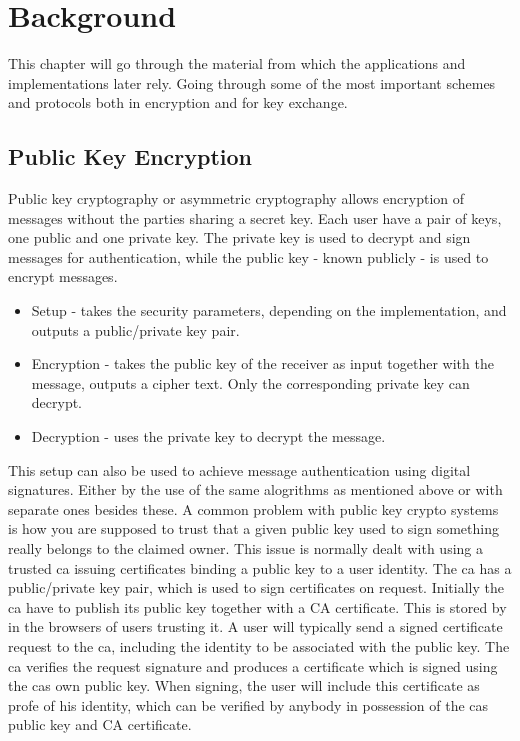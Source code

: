 \chapter{Background}
\label{chp:background} 
This chapter will go through the material from which the applications and implementations later rely. Going through some of the most important schemes and protocols both in encryption and for key exchange.

\section{Public Key Encryption}\label{sec:pke}
Public key cryptography or asymmetric cryptography allows encryption of messages without the parties sharing a secret key. Each user have a pair of keys, one public and one private key. The private key is used to decrypt and sign messages for authentication, while the public key - known publicly - is used to encrypt messages. 
\begin{itemize}
\item Setup - takes the security parameters, depending on the implementation, and outputs a public/private key pair.
\item Encryption - takes the public key of the receiver as input together with the message, outputs a cipher text. Only the corresponding private key can decrypt.
\item Decryption - uses the private key to decrypt the message.
\end{itemize}

This setup can also be used to achieve message authentication using digital signatures. Either by the use of the same alogrithms as mentioned above or with separate ones besides these. A common problem with public key crypto systems is how you are supposed to trust that a given public key used to sign something really belongs to the claimed owner. This issue is normally dealt with using a trusted \gls{ca} issuing certificates binding a public key to a user identity. The \gls{ca} has a public/private key pair, which is used to sign certificates on request. Initially the \gls{ca} have to publish its public key together with a CA certificate. This is stored by in the browsers of users trusting it. A user will typically send a signed certificate request to the \gls{ca}, including the identity to be associated with the public key. The \gls{ca} verifies the request signature and produces a certificate which is signed using the \glspl{ca} own public key. When signing, the user will include this certificate as profe of his identity, which can be verified by anybody in possession of the \glspl{ca} public key and CA certificate. 

